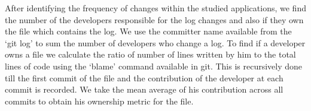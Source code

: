 


After identifying the frequency of changes within the studied applications, we find the number of the developers responsible for the log changes and also if they own the file which contains the log. We use the committer name available from the `git log' to sum the number of developers who change a log. To find if a developer owns a file we calculate the ratio of number of lines written by him to the total lines of code using the `blame' command available in git. This is recursively done till the first commit of the file and the contribution of the developer at each commit is recorded.  We take the mean average of his contribution across all commits to obtain his ownership metric for the file. 

